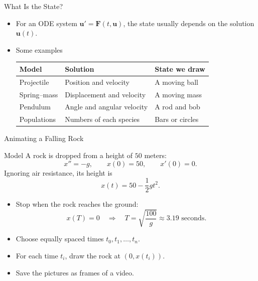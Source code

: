 \documentclass[10pt]{beamer}
\begin{document}
\begin{frame}{What Is the State?}

\begin{itemize}
    \item  For an ODE system $\mathbf{u}'=\mathbf{F}(t,\mathbf{u})$, the state usually depends on the solution $\mathbf{u}(t)$. 

\item Some examples
\begin{center}
\begin{tabular}{l|l|l}
Model & Solution & State we draw\\ \hline
Projectile & Position and velocity & A moving ball\\
Spring--mass & Displacement and velocity & A moving mass\\
Pendulum & Angle and angular velocity & A rod and bob\\
Populations & Numbers of each species & Bars or circles
\end{tabular}
\end{center}
\vspace{3mm}

\end{itemize}
\end{frame}
\begin{frame}{Animating a Falling Rock}

\begin{block}{Model}
A rock is dropped from a height of $50$ meters:
\[
x''=-g,\qquad x(0)=50,\qquad x'(0)=0.
\]
Ignoring air resistance, its height is
\[
x(t)=50-\frac{1}{2}gt^2.
\]
\end{block}

\begin{itemize}
    \item Stop when the rock reaches the ground:
    \[
    x(T)=0
    \quad\Longrightarrow\quad
    T=\sqrt{\frac{100}{g}}\approx 3.19\text{ seconds}.
    \]
    \item Choose equally spaced times $t_0,t_1,\ldots,t_n$.
    \item For each time $t_i$, draw the rock at $(0,x(t_i))$.
    \item Save the pictures as frames of a video.
\end{itemize}

\end{frame}
\end{document}
